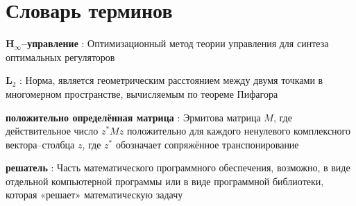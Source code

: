 \chapter*{Словарь терминов}             %

\textbf{\(\mathbf{H}_\infty\)--управление } : Оптимизационный метод теории управления для синтеза оптимальных регуляторов

\textbf{\(\mathbf{L}_2\)} : Норма, является геометрическим расстоянием между двумя точками в многомерном пространстве, вычисляемым по теореме Пифагора

\textbf{положительно определённая матрица} : Эрмитова матрица $M$, где действительное число $z^* M z$ положительно для каждого ненулевого комплексного вектора--столбца $z$, где $z^*$ обозначает сопряжённое транспонирование

\textbf{решатель} : Часть математического программного обеспечения, возможно, в виде отдельной компьютерной программы или в виде программной библиотеки, которая «решает» математическую задачу